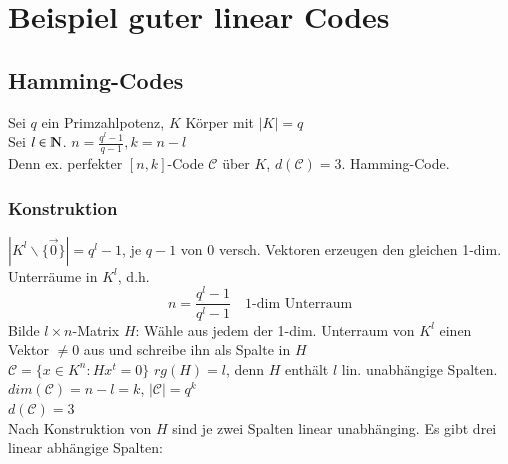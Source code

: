 \section{Beispiel guter linear Codes}
\subsection{Hamming-Codes}
Sei $q$ ein Primzahlpotenz, $K$ K\"orper mit $\left| K \right| = q$\\
Sei $l \in  \N$. $n=\frac{q^l-1}{q-1}, k=n-l$  \\
Denn ex. perfekter $[n,k]$-Code $\mathcal{C}$ \"uber $K$, $d(\mathcal{C})=3$.
Hamming-Code.
\subsubsection{Konstruktion}
$\left| K^l \backslash \lbrace \vec{0} \rbrace \right| = q^l -1$, je $q-1$ von $0$ versch. Vektoren erzeugen den gleichen 1-dim. Unterr\"aume in $K^l$, d.h.
\[
	n = \frac{q^l-1}{q^l-1} \quad \text{1-dim Unterraum}
\]
Bilde $l\times n$-Matrix $H$: W\"ahle aus jedem der 1-dim. Unterraum von $K^l$ einen Vektor $\neq 0$ aus und schreibe ihn als Spalte in $H$\\
$\mathcal{C} = \lbrace x \in K^n : Hx^t=0 \rbrace$
%
$rg(H)=l$, denn $H$ enth\"alt $l$ lin. unabh\"angige Spalten.\\
$dim(\mathcal{C})=n-l=k$, $\left| \mathcal{C} \right | = q^k$ \\
$d(\mathcal{C})=3$\\
Nach Konstruktion von $H$ sind je zwei Spalten linear unabh\"anging. Es gibt drei linear abh\"angige Spalten:
